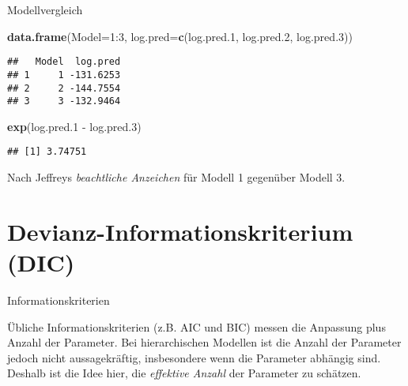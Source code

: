 \documentclass[ignorenonframetext,]{beamer}
\newenvironment{Shaded}{\begin{snugshade}}{\end{snugshade}}
\newcommand{\KeywordTok}[1]{\textcolor[rgb]{0.13,0.29,0.53}{\textbf{{#1}}}}
\newcommand{\DataTypeTok}[1]{\textcolor[rgb]{0.13,0.29,0.53}{{#1}}}
\newcommand{\DecValTok}[1]{\textcolor[rgb]{0.00,0.00,0.81}{{#1}}}
\newcommand{\FloatTok}[1]{\textcolor[rgb]{0.00,0.00,0.81}{{#1}}}
\newcommand{\StringTok}[1]{\textcolor[rgb]{0.31,0.60,0.02}{{#1}}}
\newcommand{\NormalTok}[1]{{#1}}
\begin{document}
\begin{frame}[fragile]{Modellvergleich}

\begin{Shaded}
\begin{Highlighting}[]
\KeywordTok{data.frame}\NormalTok{(}\DataTypeTok{Model=}\DecValTok{1}\NormalTok{:}\DecValTok{3}\NormalTok{, }\DataTypeTok{log.pred=}\KeywordTok{c}\NormalTok{(log.pred}\FloatTok{.1}\NormalTok{, log.pred}\FloatTok{.2}\NormalTok{, log.pred}\FloatTok{.3}\NormalTok{))}
\end{Highlighting}
\end{Shaded}

\begin{verbatim}
##   Model  log.pred
## 1     1 -131.6253
## 2     2 -144.7554
## 3     3 -132.9464
\end{verbatim}

\begin{Shaded}
\begin{Highlighting}[]
\KeywordTok{exp}\NormalTok{(log.pred}\FloatTok{.1} \NormalTok{-}\StringTok{ }\NormalTok{log.pred}\FloatTok{.3}\NormalTok{)}
\end{Highlighting}
\end{Shaded}

\begin{verbatim}
## [1] 3.74751
\end{verbatim}

Nach Jeffreys \emph{beachtliche Anzeichen} für Modell 1 gegenüber Modell
3.

\end{frame}

\section{Devianz-Informationskriterium
(DIC)}\label{devianz-informationskriterium-dic}

\begin{frame}{Informationskriterien}

Übliche Informationskriterien (z.B. AIC und BIC) messen die Anpassung
plus Anzahl der Parameter. Bei hierarchischen Modellen ist die Anzahl
der Parameter jedoch nicht aussagekräftig, insbesondere wenn die
Parameter abhängig sind. Deshalb ist die Idee hier, die \emph{effektive
Anzahl} der Parameter zu schätzen.

\end{frame}
\end{document}
